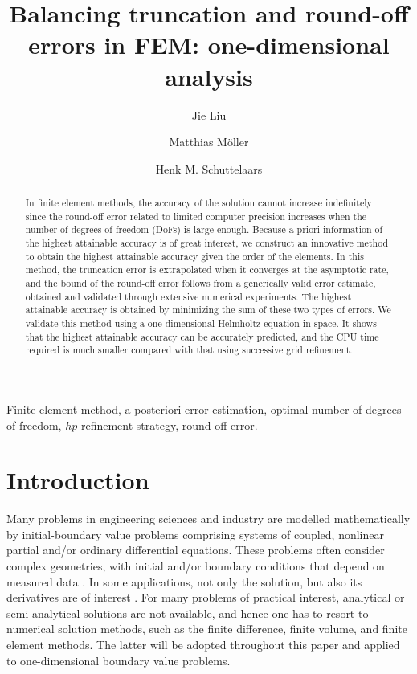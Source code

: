\documentclass[review,3p]{elsarticle}
\begin{document}
\begin{frontmatter}

\title{Balancing truncation and round-off errors in FEM: one-dimensional analysis}

\author[1]{Jie Liu}
\author[1]{Matthias M\"oller}
\author[1]{Henk M. Schuttelaars}
 
\address[1]{Delft Institute of Applied Mathematics\\ Delft University of Technology\\ Van Mourik Broekmanweg 6, 2628 XE Delft, The Netherlands}

\begin{abstract}
In finite element methods, the accuracy of the solution cannot increase indefinitely since the round-off error related to limited computer precision increases when the number of degrees of freedom (DoFs) is large enough. Because a priori information of the highest attainable accuracy is of great interest, we construct an innovative method to obtain the highest attainable accuracy given the order of the elements.
In this method, the truncation error is extrapolated when it converges at the asymptotic rate, and the bound of the round-off error follows from a generically valid error estimate, obtained and validated through extensive numerical experiments. The highest attainable accuracy is obtained by minimizing the sum of these two types of errors.
We validate this method using a one-dimensional Helmholtz equation in space. 
It shows that the highest attainable accuracy can be accurately predicted, and the CPU time required is much smaller compared with that using successive grid refinement. 
\end{abstract}

\begin{keyword}
Finite element method, a posteriori error estimation, optimal number of degrees of freedom, $hp$-refinement strategy, round-off error.
\end{keyword}

\end{frontmatter}

\section{Introduction}

Many problems in engineering sciences and industry are modelled mathematically by initial-boundary value problems comprising systems of coupled, nonlinear partial and/or ordinary differential equations. These problems often consider complex geometries, with initial and/or boundary conditions that depend on measured data \cite{Kumar2016}. 
In some applications, not only the solution, but also its derivatives are of interest \cite{Kumar2016,carey1982derivative}.
For many problems of practical interest, analytical or semi-analytical solutions are not available, and hence one has to resort to numerical solution methods, such as the finite difference, finite volume, and finite element methods. The latter will be adopted throughout this paper and applied to one-dimensional boundary value problems.
\end{document}
